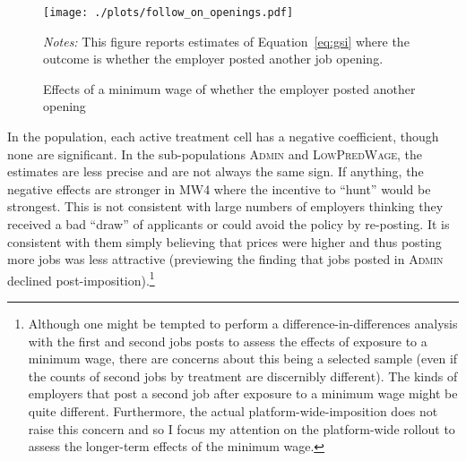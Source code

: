 \documentclass[AER]{AEA}
\newcommand{\admin}{\textsc{Admin}}
\newcommand{\lpw}{\textsc{LowPredWage}}
\begin{document}
\begin{figure}[h!]
  \centering
  \caption{Effects of a minimum wage of whether the employer posted another opening} \label{fig:all_new_follow_on_openings}
  \begin{minipage}{1.15\linewidth}
  \texttt{[image: ./plots/follow\_on\_openings.pdf]}
  \end{minipage}
  \begin{minipage}{0.95\linewidth}
    {\footnotesize
      \emph{Notes:} This figure reports estimates of Equation~\ref{eq:gsi} where the outcome is whether the employer posted another job opening. 
    }
\end{minipage} 
\end{figure} 

In the population, each active treatment cell has a negative coefficient, though none are significant.
In the sub-populations \admin{} and \lpw{}, the estimates are less precise and are not always the same sign.
If anything, the negative effects are stronger in MW4 where the incentive to ``hunt'' would be strongest.
This is not consistent with large numbers of employers thinking they received a bad ``draw'' of applicants or could avoid the policy by re-posting.
It is consistent with them simply believing that prices were higher
and thus posting more jobs was less attractive (previewing the finding
that jobs posted in \admin{} declined post-imposition).\footnote{
  Although one might be tempted to perform a difference-in-differences analysis with the first and second jobs posts to assess the effects of exposure to a minimum wage, there are concerns about this being a selected sample (even if the counts of second jobs by treatment are discernibly different).
  The kinds of employers that post a second job after exposure to a minimum wage might be quite different.
  Furthermore, the actual platform-wide-imposition does not raise this concern and so I focus my attention on the platform-wide rollout to assess the longer-term effects of the minimum wage. 
} 
\end{document}
